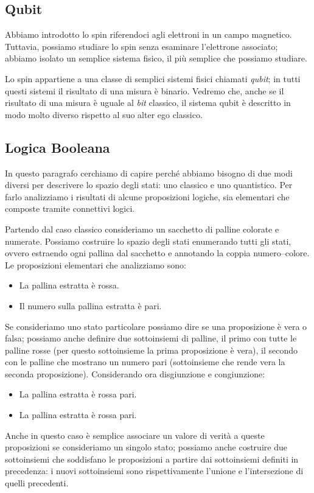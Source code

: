 \subsection{Qubit}
Abbiamo introdotto lo spin riferendoci agli elettroni in un campo magnetico. Tuttavia, possiamo studiare lo spin senza esaminare l'elettrone associato; abbiamo isolato un semplice sistema fisico, il più semplice che possiamo studiare.

Lo spin appartiene a una classe di semplici sistemi fisici chiamati \emph{qubit}; in tutti questi sistemi il risultato di una misura è binario. Vedremo che, anche se il risultato di una misura è uguale al \emph{bit} classico, il sistema qubit è descritto in modo molto diverso rispetto al suo alter ego classico.

\subsection{Logica Booleana}
In questo paragrafo cerchiamo di capire perché abbiamo bisogno di due modi diversi per descrivere lo spazio degli stati: uno classico e uno quantistico. Per farlo analizziamo i risultati di alcune proposizioni logiche, sia elementari che composte tramite connettivi logici.

Partendo dal caso classico consideriamo un sacchetto di palline colorate e numerate. Possiamo costruire lo spazio degli stati enumerando tutti gli stati, ovvero estraendo ogni pallina dal sacchetto e annotando la coppia numero–colore. Le proposizioni elementari che analizziamo sono:
\begin{itemize}
	\item La pallina estratta è rossa.
	\item Il numero sulla pallina estratta è pari.
\end{itemize}

Se consideriamo uno stato particolare possiamo dire se una proposizione è vera o falsa; possiamo anche definire due sottoinsiemi di palline, il primo con tutte le palline rosse (per questo sottoinsieme la prima proposizione è vera), il secondo con le palline che mostrano un numero pari (sottoinsieme che rende vera la seconda proposizione). Considerando ora disgiunzione e congiunzione:
\begin{itemize}
	\item La pallina estratta è rossa  pari.
	\item La pallina estratta è rossa  pari.
\end{itemize}
Anche in questo caso è semplice associare un valore di verità a queste proposizioni se consideriamo un singolo stato; possiamo anche costruire due sottoinsiemi che soddisfano le proposizioni a partire dai sottoinsiemi definiti in precedenza: i nuovi sottoinsiemi sono rispettivamente l'unione e l'intersezione di quelli precedenti.

